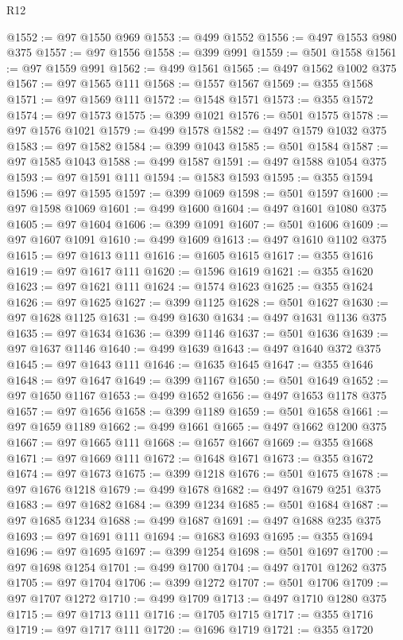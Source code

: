 \begin{lexlean}{R12}
\begin{coremodule}
{{{{{{{{{{{{{{{{{{{{{{{{{{{{{{{{{{{{{{{{{{{{{{{{{{{{{{{{{{{{{{{{{{{{{{{{{{{{{{{{{{@1552 := @97 @1550 @969
@1553 := @499 @1552
@1556 := @497 @1553 @980 @375
@1557 := @97 @1556
@1558 := @399 @991
@1559 := @501 @1558
@1561 := @97 @1559 @991
@1562 := @499 @1561
@1565 := @497 @1562 @1002 @375
@1567 := @97 @1565 @111
@1568 := @1557 @1567
@1569 := @355 @1568
@1571 := @97 @1569 @111
@1572 := @1548 @1571
@1573 := @355 @1572
@1574 := @97 @1573
@1575 := @399 @1021
@1576 := @501 @1575
@1578 := @97 @1576 @1021
@1579 := @499 @1578
@1582 := @497 @1579 @1032 @375
@1583 := @97 @1582
@1584 := @399 @1043
@1585 := @501 @1584
@1587 := @97 @1585 @1043
@1588 := @499 @1587
@1591 := @497 @1588 @1054 @375
@1593 := @97 @1591 @111
@1594 := @1583 @1593
@1595 := @355 @1594
@1596 := @97 @1595
@1597 := @399 @1069
@1598 := @501 @1597
@1600 := @97 @1598 @1069
@1601 := @499 @1600
@1604 := @497 @1601 @1080 @375
@1605 := @97 @1604
@1606 := @399 @1091
@1607 := @501 @1606
@1609 := @97 @1607 @1091
@1610 := @499 @1609
@1613 := @497 @1610 @1102 @375
@1615 := @97 @1613 @111
@1616 := @1605 @1615
@1617 := @355 @1616
@1619 := @97 @1617 @111
@1620 := @1596 @1619
@1621 := @355 @1620
@1623 := @97 @1621 @111
@1624 := @1574 @1623
@1625 := @355 @1624
@1626 := @97 @1625
@1627 := @399 @1125
@1628 := @501 @1627
@1630 := @97 @1628 @1125
@1631 := @499 @1630
@1634 := @497 @1631 @1136 @375
@1635 := @97 @1634
@1636 := @399 @1146
@1637 := @501 @1636
@1639 := @97 @1637 @1146
@1640 := @499 @1639
@1643 := @497 @1640 @372 @375
@1645 := @97 @1643 @111
@1646 := @1635 @1645
@1647 := @355 @1646
@1648 := @97 @1647
@1649 := @399 @1167
@1650 := @501 @1649
@1652 := @97 @1650 @1167
@1653 := @499 @1652
@1656 := @497 @1653 @1178 @375
@1657 := @97 @1656
@1658 := @399 @1189
@1659 := @501 @1658
@1661 := @97 @1659 @1189
@1662 := @499 @1661
@1665 := @497 @1662 @1200 @375
@1667 := @97 @1665 @111
@1668 := @1657 @1667
@1669 := @355 @1668
@1671 := @97 @1669 @111
@1672 := @1648 @1671
@1673 := @355 @1672
@1674 := @97 @1673
@1675 := @399 @1218
@1676 := @501 @1675
@1678 := @97 @1676 @1218
@1679 := @499 @1678
@1682 := @497 @1679 @251 @375
@1683 := @97 @1682
@1684 := @399 @1234
@1685 := @501 @1684
@1687 := @97 @1685 @1234
@1688 := @499 @1687
@1691 := @497 @1688 @235 @375
@1693 := @97 @1691 @111
@1694 := @1683 @1693
@1695 := @355 @1694
@1696 := @97 @1695
@1697 := @399 @1254
@1698 := @501 @1697
@1700 := @97 @1698 @1254
@1701 := @499 @1700
@1704 := @497 @1701 @1262 @375
@1705 := @97 @1704
@1706 := @399 @1272
@1707 := @501 @1706
@1709 := @97 @1707 @1272
@1710 := @499 @1709
@1713 := @497 @1710 @1280 @375
@1715 := @97 @1713 @111
@1716 := @1705 @1715
@1717 := @355 @1716
@1719 := @97 @1717 @111
@1720 := @1696 @1719
@1721 := @355 @1720
}}}}}}}}}}}}}}}}}}}}}}}}}}}}}}}}}}}}}}}}}}}}}}}}}}}}}}}}}}}}}}}}}}}}}}}}}}}}}}}}}}
\end{coremodule}
\end{lexlean}
